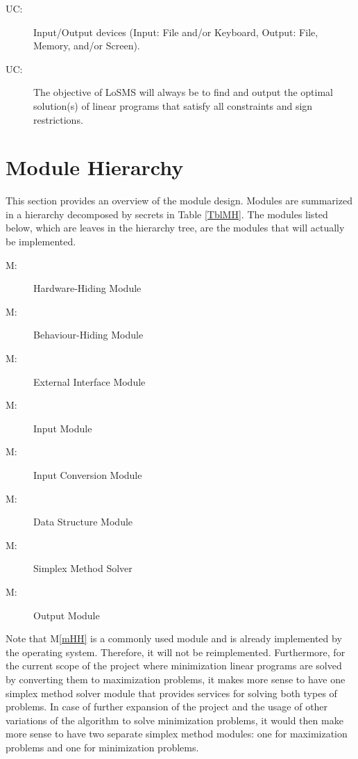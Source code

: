 \documentclass[12pt, titlepage]{article}
\newcounter{ucnum}
\newcommand{\uctheucnum}{UC\theucnum}
\newcounter{mnum}
\newcommand{\mthemnum}{M\themnum}
\newcommand{\mref}[1]{M\ref{#1}}
\newcommand{\famname}{LoSMS} %
\begin{document}
\begin{description}
\item[ \uctheucnum \label{ucIO}:] Input/Output devices
  (Input: File and/or Keyboard, Output: File, Memory, and/or Screen).

\item[ \uctheucnum \label{ucObjective}:] The objective of 
\famname{} will always be to find and output the optimal solution(s) of linear 
programs that satisfy all constraints and sign restrictions.
\end{description}

\section{Module Hierarchy} \label{SecMH}

This section provides an overview of the module design. Modules are summarized
in a hierarchy decomposed by secrets in Table \ref{TblMH}. The modules listed
below, which are leaves in the hierarchy tree, are the modules that will
actually be implemented.

\begin{description}
\item [ \mthemnum \label{mHH}:] Hardware-Hiding Module
\item [ \mthemnum \label{mBH}:] Behaviour-Hiding Module
\item [ \mthemnum \label{mEI}:] External Interface Module
\item [ \mthemnum \label{mInput}:] Input Module
\item [ \mthemnum \label{mIC}:] Input Conversion Module
\item [ \mthemnum \label{mDataStructure}:] Data Structure 
Module
\item [ \mthemnum \label{mSimplex}:] Simplex Method Solver
\item [ \mthemnum \label{mOutput}:] Output Module
\end{description}

Note that \mref{mHH} is a commonly used module and is already implemented by 
the operating system. Therefore, it will not be reimplemented. Furthermore, for 
the current scope of the project where minimization linear programs are solved 
by converting them to maximization problems, it makes more sense to have one 
simplex method solver module that provides services for solving both types of 
problems. In case of further expansion of the project and the usage of other 
variations of the algorithm to solve minimization problems, it would then make 
more sense to have two separate simplex method modules: one for maximization 
problems and one for minimization problems.
\end{document}
